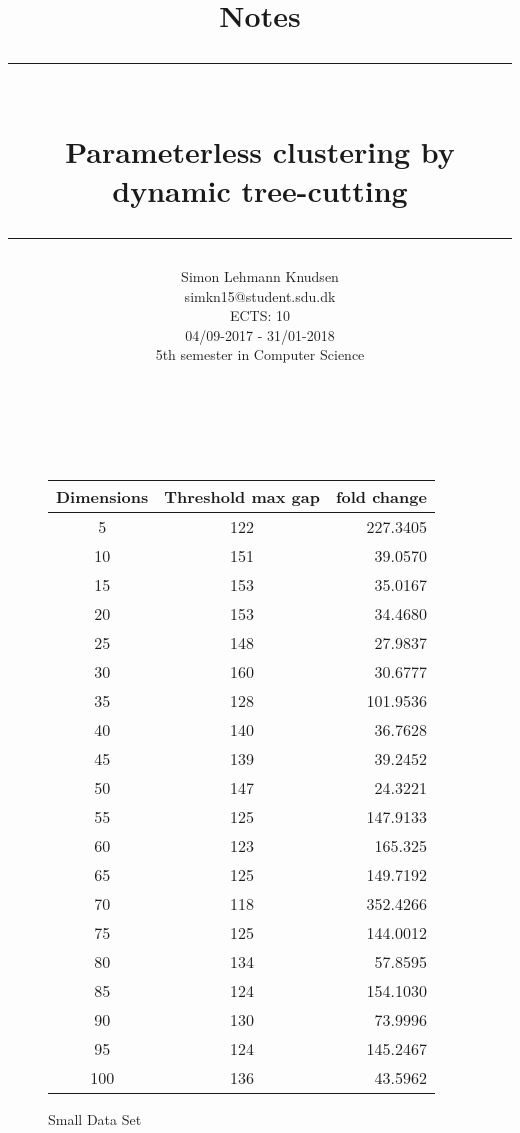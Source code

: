 \documentclass[a4paper,10pt]{article}
\title{ Notes \\\rule{5.5cm}{0.5mm} \\ Parameterless clustering by dynamic tree-cutting \\\rule{10cm}{0.5mm}}
\author{Simon Lehmann Knudsen \\
	simkn15@student.sdu.dk \\
	ECTS: 10 \\
	04/09-2017 - 31/01-2018 \\
	5th semester in Computer Science
\\\rule{5.5cm}{0.5mm}\\}
\begin{document}
\begin{figure}[h]
	\centering
	\begin{tabular}{|c|c|r|}
		\hline
		Dimensions & Threshold max gap & fold change \\\hline
		5   & 122 & 227.3405 \\\hline
		10  & 151 & 39.0570 \\\hline
		15  & 153 & 35.0167 \\\hline
		20  & 153 & 34.4680 \\\hline
		25  & 148 & 27.9837 \\\hline
		30  & 160 & 30.6777 \\\hline
		35  & 128 & 101.9536 \\\hline
		40  & 140 & 36.7628 \\\hline
		45  & 139 & 39.2452 \\\hline
		50  & 147 & 24.3221 \\\hline	
		55  & 125 & 147.9133 \\\hline
		60  & 123 & 165.325 \\\hline
		65  & 125 & 149.7192 \\\hline
		70  & 118 & 352.4266 \\\hline
		75  & 125 & 144.0012 \\\hline
		80  & 134 & 57.8595 \\\hline
		85  & 124 & 154.1030 \\\hline
		90  & 130 & 73.9996 \\\hline
		95  & 124 & 145.2467 \\\hline
		100 & 136 & 43.5962 \\\hline
	\end{tabular}
	\caption{Small Data Set}
\end{figure}
\end{document}
